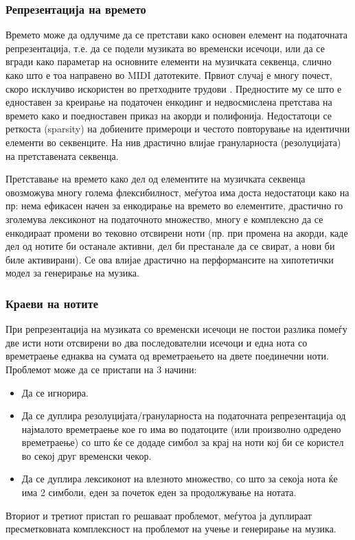 \subsubsection{Репрезентација на времето}

Времето може да одлучиме да се претстави како основен елемент на податочната репрезентација, т.е. да се подели музиката во временски исечоци, или да се вгради како параметар на основните елементи на музичката секвенца, слично како што е тоа направено во MIDI датотеките. Првиот случај е многу почест, скоро исклучиво искористен во претходните трудови \cite{Hadjeres2016,Boulanger-Lewandowski2012,Boulanger-Lewandowski2014,Eck2002,Eck2008,Walder2016,Dong2017,Dong2018}. Предностите му се што е едноставен за креирање на податочен енкодинг и недвосмислена претстава на времето како и поедноставен приказ на акорди и полифонија. Недостатоци се реткоста (sparsity) на добиените примероци и честото повторување на идентични елементи во секвенците. На нив драстично влијае грануларноста (резолуцијата) на претставената секвенца. 

Претставање на времето како дел од елементите на музичката секвенца овозможува многу голема флексибилност, меѓутоа има доста недостатоци како на пр: нема ефикасен начен за енкодирање на времето во елементите, драстично го зголемува лексиконот на податочното множество, многу е комплексно да се енкодираат промени во тековно отсвирени ноти (пр. при промена на акорди, каде дел од нотите би останале активни, дел би престанале да се свират, а нови би биле активирани). Се ова влијае драстично на перформансите на хипотетички модел за генерирање на музика.

\subsubsection{Краеви на нотите}

При репрезентација на музиката со временски исечоци не постои разлика помеѓу две исти ноти отсвирени во два последователни исечоци и една нота со времетраење еднаква на сумата од времетраењето на двете поединечни ноти. Проблемот може да се пристапи на 3 начини:
\begin{itemize}
    \item Да се игнорира.
    \item Да се дуплира резолуцијата/грануларноста на податочната репрезентација од најмалото времетраење кое го има во податоците (или произволно одредено времетраење) со што ќе се додаде симбол за крај на ноти кој би се користел во секој друг временски чекор.
    \item Да се дуплира лексиконот на влезното множество, со што за секоја нота ќе има 2 симболи, еден за почеток еден за продолжување на нотата.
\end{itemize}
Вториот и третиот пристап го решаваат проблемот, меѓутоа ја дуплираат пресметковната комплексност на проблемот на учење и генерирање на музика.

